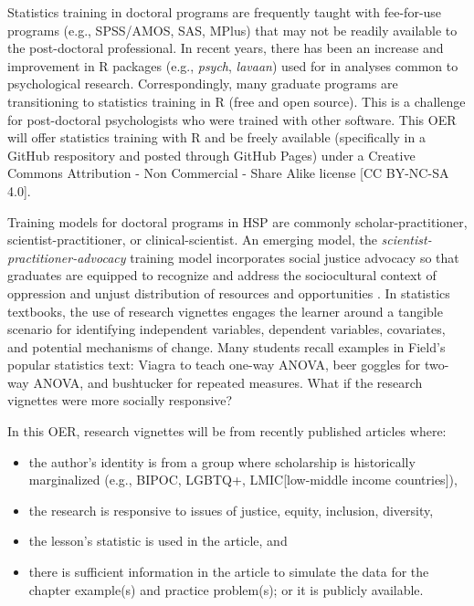 \documentclass[
]{book}
\providecommand{\tightlist}{%
  \setlength{\itemsep}{0pt}\setlength{\parskip}{0pt}}
\begin{document}
Statistics training in doctoral programs are frequently taught with fee-for-use programs (e.g., SPSS/AMOS, SAS, MPlus) that may not be readily available to the post-doctoral professional. In recent years, there has been an increase and improvement in R packages (e.g., \emph{psych}, \emph{lavaan}) used for in analyses common to psychological research. Correspondingly, many graduate programs are transitioning to statistics training in R (free and open source). This is a challenge for post-doctoral psychologists who were trained with other software. This OER will offer statistics training with R and be freely available (specifically in a GitHub respository and posted through GitHub Pages) under a Creative Commons Attribution - Non Commercial - Share Alike license {[}CC BY-NC-SA 4.0{]}.

Training models for doctoral programs in HSP are commonly scholar-practitioner, scientist-practitioner, or clinical-scientist. An emerging model, the \emph{scientist-practitioner-advocacy} training model incorporates social justice advocacy so that graduates are equipped to recognize and address the sociocultural context of oppression and unjust distribution of resources and opportunities \citep{mallinckrodt_scientist-practitioner-advocate_2014}. In statistics textbooks, the use of research vignettes engages the learner around a tangible scenario for identifying independent variables, dependent variables, covariates, and potential mechanisms of change. Many students recall examples in Field's \citeyearpar{field_discovering_2012} popular statistics text: Viagra to teach one-way ANOVA, beer goggles for two-way ANOVA, and bushtucker for repeated measures. What if the research vignettes were more socially responsive?

In this OER, research vignettes will be from recently published articles where:

\begin{itemize}
\tightlist
\item
  the author's identity is from a group where scholarship is historically marginalized (e.g., BIPOC, LGBTQ+, LMIC{[}low-middle income countries{]}),
\item
  the research is responsive to issues of justice, equity, inclusion, diversity,
\item
  the lesson's statistic is used in the article, and
\item
  there is sufficient information in the article to simulate the data for the chapter example(s) and practice problem(s); or it is publicly available.
\end{itemize}
\end{document}
